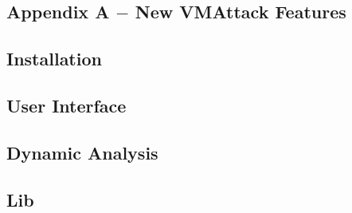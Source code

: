 \documentclass[10pt,twoside,a4paper,bibliography=totoc]{scrbook}
\makeatletter
\def\cleardoublepage{\clearpage\if@twoside \ifodd\c@page\else
  \hbox{}
  \thispagestyle{plain}
  \newpage
  \if@twocolumn\hbox{}\newpage\fi\fi\fi}
\makeatother
\begin{document}
\cleardoublepage

%
% 
\begin{appendix}
\chapter{Appendix A $-$ New VMAttack Features}
\section{Installation}
\section{User Interface}
\section{Dynamic Analysis}
\section{Lib}

\end{appendix}
\end{document}
